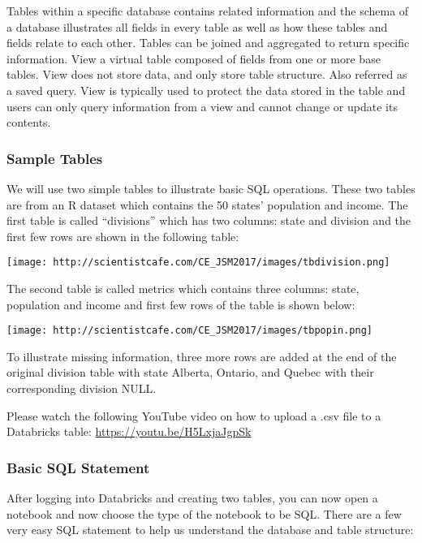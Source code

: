 \documentclass[
]{article}
\begin{document}
Tables within a specific database contains related information and the
schema of a database illustrates all fields in every table as well as
how these tables and fields relate to each other. Tables can be joined
and aggregated to return specific information. View a virtual table
composed of fields from one or more base tables. View does not store
data, and only store table structure. Also referred as a saved query.
View is typically used to protect the data stored in the table and users
can only query information from a view and cannot change or update its
contents.

\hypertarget{sample-tables}{%
\subsubsection{Sample Tables}\label{sample-tables}}

We will use two simple tables to illustrate basic SQL operations. These
two tables are from an R dataset which contains the 50 states'
population and income. The first table is called ``divisions'' which has
two columns: state and division and the first few rows are shown in the
following table:

\texttt{[image: http://scientistcafe.com/CE\_JSM2017/images/tbdivision.png]}

The second table is called metrics which contains three columns: state,
population and income and first few rows of the table is shown below:

\texttt{[image: http://scientistcafe.com/CE\_JSM2017/images/tbpopin.png]}

To illustrate missing information, three more rows are added at the end
of the original division table with state Alberta, Ontario, and Quebec
with their corresponding division NULL.

Please watch the following YouTube video on how to upload a .csv file to
a Databricks table: \url{https://youtu.be/H5LxjaJgpSk}

\hypertarget{basic-sql-statement}{%
\subsubsection{Basic SQL Statement}\label{basic-sql-statement}}

After logging into Databricks and creating two tables, you can now open
a notebook and now choose the type of the notebook to be SQL. There are
a few very easy SQL statement to help us understand the database and
table structure:
\end{document}
